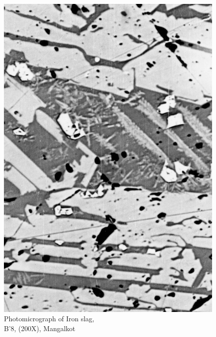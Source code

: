 \begin{figure}[H]
\renewcommand{\thefigure}{19A}
\includegraphics[scale=0.6]{images/chapter-4/fig019A.jpg}
\caption{Photomicrograph of Iron slag,\\ B’8, (200X), Mangalkot}\label{chapter-4-fig19A}
\end{figure}

\newpage

